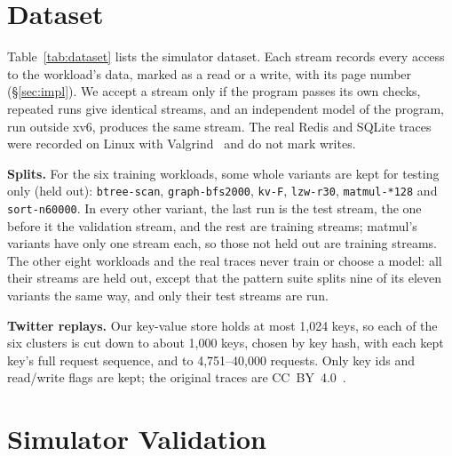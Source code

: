 \documentclass{article}
\newcommand{\wfifteen}{../week_15_update/tables}
\newcommand{\finding}[1]{\textbf{#1}\hspace{0.4em}}
\newif\ifwithappendix
\begin{document}
\ifwithappendix
\clearpage
\onecolumn
\appendix

\section{Dataset}
\label{app:data}

Table~\ref{tab:dataset} lists the simulator dataset. Each stream records every access to the workload's data, marked as a read or a write, with its page number (\S\ref{sec:impl}). We accept a stream only if the program passes its own checks, repeated runs give identical streams, and an independent model of the program, run outside xv6, produces the same stream. The real Redis and SQLite traces were recorded on Linux with Valgrind~\citep{nethercote2007valgrind} and do not mark writes.

\finding{Splits.} For the six training workloads, some whole variants are kept for testing only (held out): \texttt{btree-scan}, \texttt{graph-bfs2000}, \texttt{kv-F}, \texttt{lzw-r30}, \texttt{matmul-*128} and \texttt{sort-n60000}. In every other variant, the last run is the test stream, the one before it the validation stream, and the rest are training streams; matmul's variants have only one stream each, so those not held out are training streams. The other eight workloads and the real traces never train or choose a model: all their streams are held out, except that the pattern suite splits nine of its eleven variants the same way, and only their test streams are run.

\finding{Twitter replays.} Our key-value store holds at most 1,024 keys, so each of the six clusters is cut down to about 1,000 keys, chosen by key hash, with each kept key's full request sequence, and to 4,751--40,000 requests. Only key ids and read/write flags are kept; the original traces are CC~BY~4.0~\citep{yang2020twitter}.

\begin{table}[h!]
\caption{The simulator dataset: 199 streams, 77 of them held out. \texttt{patb} is a second, independently written pattern suite; kv includes the six Twitter replays (kv-T), all held out.}
\label{tab:dataset}
\vskip 0.05in
\begin{center}
\end{center}
\end{table}



\FloatBarrier
\section{Simulator Validation}
\label{app:sim}
\end{document}
